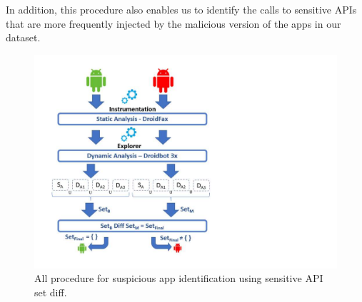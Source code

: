 In addition, this procedure also enables us to identify the calls to sensitive APIs that are more frequently injected by the malicious version of the apps
in our dataset. 


\begin{figure}[ht]
\centering
\includegraphics[scale=0.45]{images/sensitiveAPIdiff.pdf}
\caption{All procedure for suspicious app identification using sensitive API set diff.}
 \label{fig:sensitiveAPI}
\end{figure}





